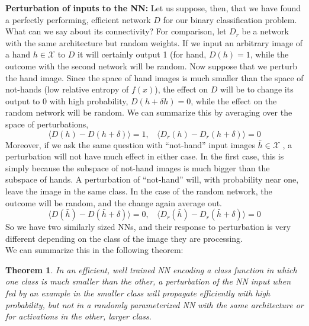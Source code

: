 \documentclass[11pt]{amsart}
\newcommand{\inputspace}{\mathcal X}
\newtheorem{theorem}{Theorem} %
\begin{document}
{\bf Perturbation of  inputs to the NN:} Let us suppose, then, that we have found a perfectly performing, efficient network  $D$ for our binary classification problem. What can we say about its connectivity? For comparison, let $D_{r}$ be a network with the same architecture  but random weights. 
If we input an arbitrary image of a hand $h \in \inputspace$ to $D$ it will certainly output 1 (for hand, $D(h)=1$, while the outcome with the second network  will be random. Now suppose that we  perturb the hand image. Since the space of hand images is much smaller than the space of not-hands (low relative entropy of $f(x)$), the effect on $D$ will be to change its output to 0 with high probability, 
$D(h+\delta h)=0$, while the effect on the random network will be random. We can summarize this by averaging over the space of perturbations, 
$$
\langle D(h) - D(h+\delta) \rangle =1, \:\: \:\: \langle D_{r}(h) - D_{r}(h+\delta) \rangle =0
$$
Moreover, if we ask the same question with ``not-hand'' input images $\bar h \in \inputspace$ , a perturbation will not have much effect in either case. In the first case, this is simply because the subspace of not-hand images is much bigger than the subspace of hands. A perturbation of ``not-hand'' will, with probability near one, leave the image in the same class. In the case of the random network, the outcome will be random, and the change again average out.
$$
\langle D(\bar h) - D(\bar h+\delta) \rangle =0, \:\: \:\:  \langle D_{r}(\bar h) - D_{r}(\bar h+\delta) \rangle =0
$$
So we have two similarly sized NNs, and their response to perturbation is very different depending on the class of the image they are processing. \\



We can summarize this in the following theorem:
\begin{theorem} In an efficient, well trained NN encoding a  class function in which one class is much smaller than the other,  a perturbation of the NN input when fed by an example in the smaller class will propagate efficiently with high probability, but not in a randomly parameterized NN with the same architecture or for activations in the other, larger class.
\end{theorem}
\end{document}
